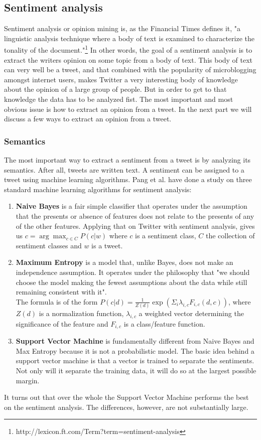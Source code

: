 \documentclass{article}
\begin{document}
\subsection{Sentiment analysis}
Sentiment analysis or opinion mining is, as the Financial Times defines it, "a linguistic analysis technique where a body of text is examined to characterize the tonality of the document."\footnote{http://lexicon.ft.com/Term?term=sentiment-analysis} In other words, the goal of a sentiment analysis is to extract the writers opinion on some topic from a body of text. This body of text can very well be a tweet, and that combined with the popularity of microblogging amongst internet users, makes Twitter a very interesting body of knowledge about the opinion of a large group of people. But in order to get to that knowledge the data has to be analyzed fist. 
The most important and most obvious issue is how to extract an opinion from a tweet. In the next part we will discuss a few ways to extract an opinion from a tweet.
\subsubsection{Semantics }
The most important way to extract a sentiment from a tweet is by analyzing its semantics. After all, tweets are written text. A sentiment can be assigned to a tweet using machine learning algorithms. Pang et al. \cite{machineLearning} have done a study on three standard machine learning algorithms for sentiment analysis: 
\begin{enumerate}
\item \textbf{Naive Bayes} is a fair simple classifier that operates under the assumption that the presents or absence of features does not relate to the presents of any of the other features. Applying that on Twitter with sentiment analysis, gives us $c = \arg\max_{c\in C} P(c|w)$ where $c$ is a sentiment class, $C$ the collection of sentiment classes and $w$ is a tweet. \cite{sentAnalysis}
\item \textbf{Maximum Entropy} is a model that, unlike Bayes, does not make an independence assumption. It operates under the philosophy that "we should choose the model making the fewest assumptions about the data while still remaining consistent with it".\cite{machineLearning} \\
The formula is of the form $P(c|d) = \frac{1}{Z(d)}\exp(\Sigma_i \lambda_{i,c}F_{i,c}(d,c))$, where $Z(d)$ is a normalization function, $\lambda_{i,c}$ a weighted vector determining the significance of the feature and $F_{i,c}$ is a class/feature function. 
\item \textbf{Support Vector Machine} is fundamentally different from Naive Bayes and Max Entropy because it is not a probabilistic model. The basic idea behind a support vector machine is that a vector is trained to separate the sentiments. Not only will it separate the training data, it will do so at the largest possible margin. 
\end{enumerate}
It turns out that over the whole the Support Vector Machine performs the best on the sentiment analysis\cite{machineLearning}. The differences, however, are not substantially large. 
\end{document}
